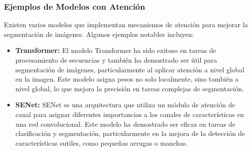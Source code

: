 \subsubsection{Ejemplos de Modelos con Atención}  
Existen varios modelos que implementan mecanismos de atención para mejorar la segmentación de imágenes. Algunos ejemplos notables incluyen:
\begin{itemize}
    \item \textbf{Transformer:} El modelo Transformer ha sido exitoso en tareas de procesamiento de secuencias y también ha demostrado ser útil para segmentación de imágenes, particularmente al aplicar atención a nivel global en la imagen. Este modelo asigna pesos no solo localmente, sino también a nivel global, lo que mejora la precisión en tareas complejas de segmentación. \parencite{autor2022transformer}
    \item \textbf{SENet:} SENet es una arquitectura que utiliza un módulo de atención de canal para asignar diferentes importancias a los canales de características en una red convolucional. Este modelo ha demostrado ser eficaz en tareas de clasificación y segmentación, particularmente en la mejora de la detección de características sutiles, como pequeñas arrugas o manchas. \parencite{autor2022cnn}
\end{itemize}



